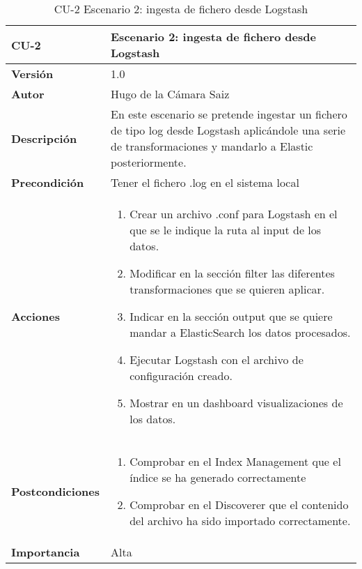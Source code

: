\begin{table}[p]
	\centering
	\begin{tabularx}{\linewidth}{ p{} p{} }
		\toprule
		\textbf{CU-2}    & \textbf{Escenario 2: ingesta de fichero desde Logstash}\\
		\toprule
		\textbf{Versión}              & 1.0    \\
		\textbf{Autor}                & Hugo de la Cámara Saiz \\
		\textbf{Descripción}          & En este escenario se pretende ingestar un fichero de tipo log desde Logstash aplicándole una serie de transformaciones y mandarlo a Elastic posteriormente. \\
		\textbf{Precondición}         & Tener el fichero .log en el sistema local \\
		\textbf{Acciones}             &
		\begin{enumerate}
			\def\labelenumi{\arabic{enumi}.}
			\tightlist
			\item Crear un archivo .conf para Logstash en el que se le indique la ruta al input de los datos.
                \item Modificar en la sección filter las diferentes transformaciones que se quieren aplicar.
                \item Indicar en la sección output que se quiere mandar a ElasticSearch los datos procesados.
                \item Ejecutar Logstash con el archivo de configuración creado.
                \item Mostrar en un dashboard visualizaciones de los datos.
		\end{enumerate}\\
            \textbf{Postcondiciones}             &
		\begin{enumerate}
			\def\labelenumi{\arabic{enumi}.}
			\tightlist
			\item Comprobar en el Index Management que el índice se ha generado correctamente
			\item Comprobar en el Discoverer que el contenido del archivo ha sido importado correctamente.
		\end{enumerate}\\
		\textbf{Importancia}          & Alta \\
		\bottomrule
	\end{tabularx}
	\caption{CU-2 Escenario 2: ingesta de fichero desde Logstash}
\end{table}

